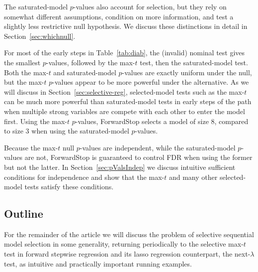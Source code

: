 \documentclass{article}
\begin{document}
The saturated-model $p$-values also account for selection, but they rely on somewhat different assumptions, condition on more information, and test a slightly less restrictive null hypothesis. We discuss these distinctions in detail in Section~\ref{sec:whichnull}.

For most of the early steps in Table~\ref{tab:diab}, the (invalid) nominal test gives the smallest $p$-values, followed by the max-$t$ test, then the saturated-model test. Both the max-$t$ and saturated-model $p$-values are exactly uniform under the null, but the max-$t$ $p$-values appear to be more powerful under the alternative. As we will discuss in Section~\ref{sec:selective-reg}, selected-model tests such as the max-$t$ can be much more powerful than saturated-model tests in early steps of the path when multiple strong variables are compete with each other to enter the model first. Using the max-$t$ $p$-values, ForwardStop selects a model of size 8, compared to size 3 when using the saturated-model $p$-values. 

Because the max-$t$ null $p$-values are independent, while the saturated-model $p$-values are not, ForwardStop is guaranteed to control FDR when using the former but not the latter. In Section~\ref{sec:pValsIndep} we discuss intuitive sufficient conditions for independence and show that the max-$t$ and many other selected-model tests satisfy these conditions.

\subsection{Outline}

For the remainder of the article we will discuss the problem of selective sequential model selection in some generality, returning periodically to the selective max-$t$ test in forward stepwise regression and its lasso regression counterpart, the next-$\lambda$ test, as intuitive and practically important running examples. 
\end{document}

